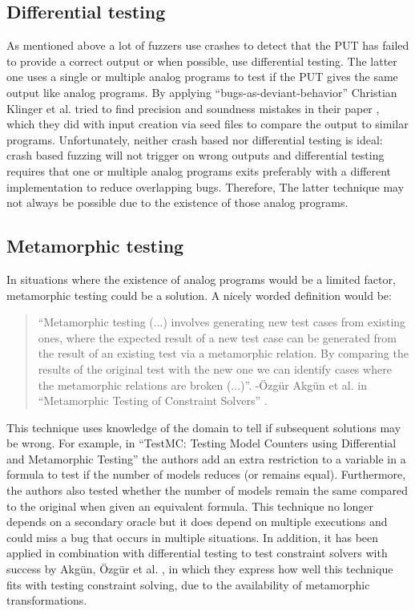 \subsection{Differential testing}
\label{fuzzing:DifferentialTesting}
As mentioned above a lot of fuzzers use crashes to detect that the PUT has failed to provide a correct output or when possible, use differential testing. The latter one uses a single or multiple analog programs to test if the PUT gives the same output like analog programs. By applying “bugs-as-deviant-behavior” Christian Klinger et al. tried to find precision and soundness mistakes in their paper \cite{48klinger2019differentially}, which they did with input creation via seed files to compare the output to similar programs. Unfortunately, neither crash based nor differential testing is ideal: crash based fuzzing will not trigger on wrong outputs and differential testing requires that one or multiple analog programs exits preferably with a different implementation to reduce overlapping bugs. Therefore, The latter technique may not always be possible due to the existence of those analog programs.

\subsection{Metamorphic testing}
\label{fuzzing:MetamorphicTesting}
In situations where the existence of analog programs would be a limited factor, metamorphic testing could be a solution. A nicely worded definition would be: 

\begin{quote}
	\label{quote:MetaMorphic}
	“Metamorphic testing (...) involves generating new test cases from existing ones, where the expected result of a new test case can be generated from the result of an existing test via a metamorphic relation. By comparing the results of the
	original test with the new one we can identify cases where the metamorphic relations are broken (...)”.
	\newline
	-\"{O}zg\"{u}r Akg\"{u}n et al. in “Metamorphic Testing of Constraint Solvers” \cite{50akgun2018metamorphic}.
\end{quote}

\noindent This technique uses knowledge of the domain to tell if subsequent solutions may be wrong. For example, in “TestMC: Testing Model Counters using Differential and Metamorphic Testing” \cite{49usman2020testmc} the authors add an extra restriction to a variable in a formula to test if the number of models reduces (or remains equal). 
Furthermore, the authors also tested whether the number of models remain the same compared to the original when given an equivalent formula.
This technique no longer depends on a secondary oracle but it does depend on multiple executions and could miss a bug that occurs in multiple situations. In addition, it has been applied in combination with differential testing to test constraint solvers with success by Akg{\"u}n, {\"O}zg{\"u}r et al. \cite{50akgun2018metamorphic}, in which they express how well this technique fits with testing constraint solving, due to the availability of metamorphic transformations.

